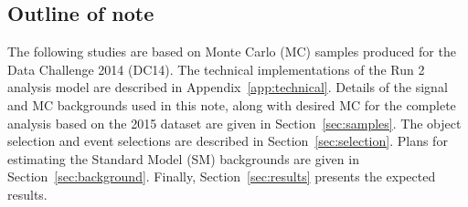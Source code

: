 \subsection{Outline of note}
The following studies are based on Monte Carlo (MC) samples produced for the Data Challenge 2014 (DC14). The technical implementations of the Run 2 analysis model are described in Appendix~\ref{app:technical}.
Details of the signal and MC backgrounds used in this note, along with desired MC for the complete analysis based on the 2015 dataset are given in Section~\ref{sec:samples}.  
The object selection and event selections are described in Section~\ref{sec:selection}.
Plans for estimating the Standard Model (SM) backgrounds are given in Section~\ref{sec:background}.
Finally, Section~\ref{sec:results} presents the expected results.

